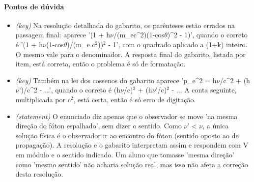 \documentclass{article}%
\begin{document}
\paragraph{Pontos de dúvida}%
\begin{itemize}%
\item%
\textit{(key)} Na resolução detalhada do gabarito, os parênteses estão errados na passagem final: aparece '(1 + h$\nu$/(m\_ec\^{}2)(1{-}cos$\theta$)\^{}2 {-} 1)', quando o correto é '(1 + h$\nu$(1-cos$\theta$)/(m\_e c$^2$))$^2$ - 1', com o quadrado aplicado a (1+k) inteiro. O mesmo vale para o denominador. A resposta final do gabarito, listada por item, está correta, então o problema é só de formatação.%
\item%
\textit{(key)} Também na lei dos cossenos do gabarito aparece 'p\_e\^{}2 = h$\nu$/c\^{}2 + (h$\nu$')/c\^{}2 - ...', quando o correto é (h$\nu$/c)$^2$ + (h$\nu$'/c)$^2$ - ... A conta seguinte, multiplicada por c$^2$, está certa, então é só erro de digitação.%
\item%
\textit{(statement)} O enunciado diz apenas que o observador se move 'na mesma direção do fóton espalhado', sem dizer o sentido. Como $\nu$' < $\nu$, a única solução física é o observador ir ao encontro do fóton (sentido oposto ao de propagação). A resolução e o gabarito interpretam assim e respondem com V em módulo e o sentido indicado. Um aluno que tomasse 'mesma direção' como 'mesmo sentido' não acharia solução real, mas isso não afeta a correção desta resolução.%
\end{itemize}%
\end{document}
